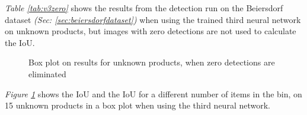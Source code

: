 \textit{Table \ref{tab:v3zero}} shows the results from the detection run on the Beiersdorf dataset \textit{(Sec: \ref{sec:beiersdorfdataset})} when using the trained third neural network on unknown products, but images with zero detections are not used to calculate the IoU.  

\begin{figure}[h]
    \centering
    \hfill
    \caption{Box plot on results for unknown products, when zero detections are eliminated}
    \label{fig:v3zerofig}
\end{figure}

\textit{Figure \ref{fig:v3zerofig}} shows the IoU and the IoU for a different number of items in the bin, on 15 unknown products in a box plot when using the third neural network.
